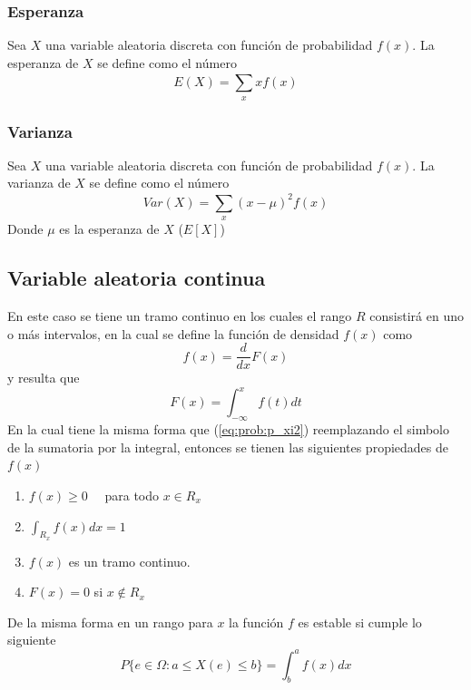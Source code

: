 \subsubsection{Esperanza}
Sea $X$ una variable aleatoria discreta con función de probabilidad $f(x)$. La esperanza de $X$ se define como el número
\begin{equation}
	E(X)=\sum\limits_{x}^{}xf(x)
\end{equation}

\subsubsection{Varianza}
Sea $X$ una variable aleatoria discreta con función de probabilidad $f(x)$. La varianza de $X$ se define como el número
\begin{equation}
	Var(X)=\sum\limits_{x}^{}{(x-\mu)}^{2}f(x)
\end{equation}
Donde $\mu$ es la esperanza de $X$ ($E[X]$) \citep{rincon2014introduccion}

\subsection{Variable aleatoria continua}\label{VAContinua}
En este caso se tiene un tramo continuo en los cuales el rango $R$ consistirá en uno o más intervalos, en la cual se define la función de densidad $f(x)$ como
\begin{equation}
	f(x) = \frac{d}{dx}F(x)
\end{equation}
y resulta que
\begin{equation}
	F(x) = \int_{- \infty}^{x}f(t)dt
\end{equation}
En la cual tiene la misma forma que (\ref{eq:prob:p_xi2}) reemplazando el simbolo de la sumatoria por la integral, entonces se tienen las siguientes propiedades de $f(x)$
\begin{enumerate}
	\item $f(x)\geq 0 \quad$ para todo $x \in {R}_{x}$
	\item $\int_{{R}_{x}}^{}f(x)dx=1$
	\item $f(x)$ es un tramo continuo.
	\item $F(x)=0$ si $x \notin {R}_{x}$ 
\end{enumerate}
De la misma forma en un rango para $x$ la función $f$ es estable si cumple lo siguiente
\begin{equation}
	P\{ e \in \Omega: a \leq X(e) \leq b \} = \int_{b}^{a}f(x)dx
\end{equation}
\citep{hines1988probabilidad}

